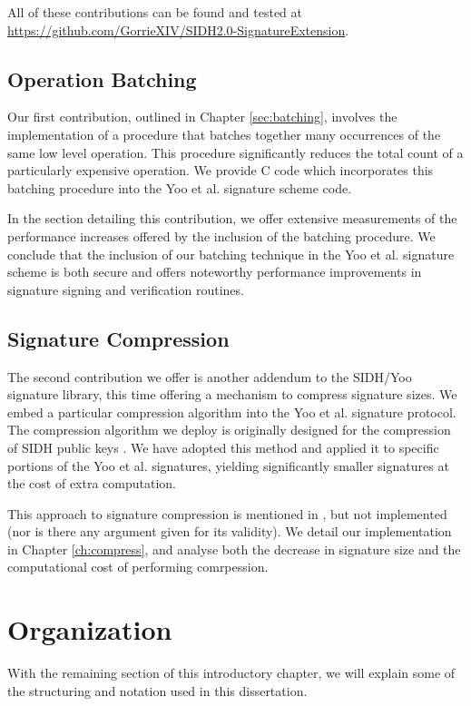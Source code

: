 \noindent
All of these contributions can be found and tested at \url{https://github.com/GorrieXIV/SIDH2.0-SignatureExtension}.

\subsection{Operation Batching}

Our first contribution, outlined in Chapter \ref{sec:batching}, involves the implementation of a procedure that batches together many occurrences of the same low level operation. This procedure significantly reduces the total count of a particularly expensive operation. We provide C code which incorporates this batching procedure into the Yoo et al. signature scheme code.

In the section detailing this contribution, we offer extensive measurements of the performance increases offered by the inclusion of the batching procedure. We conclude that the inclusion of our batching technique in the Yoo et al. signature scheme is both secure and offers noteworthy performance improvements in signature signing and verification routines.

\subsection{Signature Compression}

The second contribution we offer is another addendum to the SIDH/Yoo signature library, this time offering a mechanism to  compress signature sizes.  We embed a particular compression algorithm into the Yoo et al. signature protocol. The compression algorithm we deploy is originally designed for the compression of SIDH public keys \cite{pkcomp}\cite{compwr}. We have adopted this method and applied it to specific portions of the Yoo et al. signatures, yielding significantly smaller signatures at the cost of extra computation.

This approach to signature compression is mentioned in \cite{yoo}, but not implemented (nor is there any argument given for its validity). We detail our implementation in Chapter \ref{ch:compress}, and analyse both the decrease in signature size and the computational cost of performing comrpession.

\section{Organization}

With the remaining section of this introductory chapter, we will explain some of the structuring and notation used in this dissertation.

